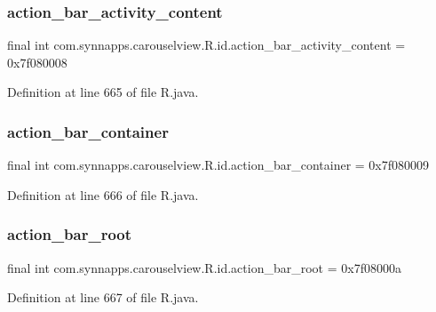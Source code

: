 \subsubsection{\texorpdfstring{action\_bar\_activity\_content}{action\_bar\_activity\_content}}
{\footnotesize\ttfamily final int com.\+synnapps.\+carouselview.\+R.\+id.\+action\+\_\+bar\+\_\+activity\+\_\+content = 0x7f080008\hspace{0.3cm}{\ttfamily [static]}}



Definition at line 665 of file R.\+java.

\mbox{\label{classcom_1_1synnapps_1_1carouselview_1_1_r_1_1id_aacb1f5f5820bc1a826a6102a11a1795f}} 
\subsubsection{\texorpdfstring{action\_bar\_container}{action\_bar\_container}}
{\footnotesize\ttfamily final int com.\+synnapps.\+carouselview.\+R.\+id.\+action\+\_\+bar\+\_\+container = 0x7f080009\hspace{0.3cm}{\ttfamily [static]}}



Definition at line 666 of file R.\+java.

\mbox{\label{classcom_1_1synnapps_1_1carouselview_1_1_r_1_1id_af9904e3fa4fd2b0c14d17f911ba46c3d}} 
\subsubsection{\texorpdfstring{action\_bar\_root}{action\_bar\_root}}
{\footnotesize\ttfamily final int com.\+synnapps.\+carouselview.\+R.\+id.\+action\+\_\+bar\+\_\+root = 0x7f08000a\hspace{0.3cm}{\ttfamily [static]}}



Definition at line 667 of file R.\+java.

